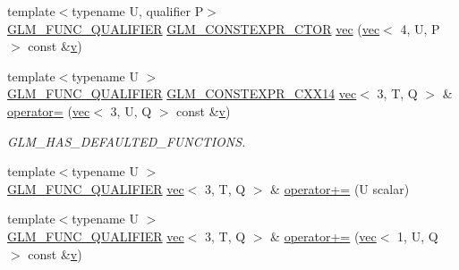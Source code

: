 \begin{DoxyCompactItemize}
\item 
{\footnotesize template$<$typename U, qualifier P$>$ }\\\mbox{\hyperlink{setup_8hpp_a33fdea6f91c5f834105f7415e2a64407}{G\+L\+M\+\_\+\+F\+U\+N\+C\+\_\+\+Q\+U\+A\+L\+I\+F\+I\+ER}} \mbox{\hyperlink{setup_8hpp_ad34178a09666081abdb573c14d1f4a5a}{G\+L\+M\+\_\+\+C\+O\+N\+S\+T\+E\+X\+P\+R\+\_\+\+C\+T\+OR}} \mbox{\hyperlink{structglm_1_1vec_3_013_00_01_t_00_01_q_01_4_a71c4b9fad3b06926109f1f8fa74f6064}{vec}} (\mbox{\hyperlink{structglm_1_1vec}{vec}}$<$ 4, U, P $>$ const \&\mbox{\hyperlink{_s_d_l__opengl_8h_a10a82eabcb59d2fcd74acee063775f90}{v}})
\item 
{\footnotesize template$<$typename U $>$ }\\\mbox{\hyperlink{setup_8hpp_a33fdea6f91c5f834105f7415e2a64407}{G\+L\+M\+\_\+\+F\+U\+N\+C\+\_\+\+Q\+U\+A\+L\+I\+F\+I\+ER}} \mbox{\hyperlink{setup_8hpp_a4dd12abf5e1164bc57f3a34671d03844}{G\+L\+M\+\_\+\+C\+O\+N\+S\+T\+E\+X\+P\+R\+\_\+\+C\+X\+X14}} \mbox{\hyperlink{structglm_1_1vec}{vec}}$<$ 3, T, Q $>$ \& \mbox{\hyperlink{structglm_1_1vec_3_013_00_01_t_00_01_q_01_4_a8d40afef0f44dc9e5c765029f6af40df}{operator=}} (\mbox{\hyperlink{structglm_1_1vec}{vec}}$<$ 3, U, Q $>$ const \&\mbox{\hyperlink{_s_d_l__opengl_8h_a10a82eabcb59d2fcd74acee063775f90}{v}})
\begin{DoxyCompactList}\small\item\em G\+L\+M\+\_\+\+H\+A\+S\+\_\+\+D\+E\+F\+A\+U\+L\+T\+E\+D\+\_\+\+F\+U\+N\+C\+T\+I\+O\+NS. \end{DoxyCompactList}\item 
{\footnotesize template$<$typename U $>$ }\\\mbox{\hyperlink{setup_8hpp_a33fdea6f91c5f834105f7415e2a64407}{G\+L\+M\+\_\+\+F\+U\+N\+C\+\_\+\+Q\+U\+A\+L\+I\+F\+I\+ER}} \mbox{\hyperlink{structglm_1_1vec}{vec}}$<$ 3, T, Q $>$ \& \mbox{\hyperlink{structglm_1_1vec_3_013_00_01_t_00_01_q_01_4_acb693fdeaa576d503444ee370c423cf3}{operator+=}} (U scalar)
\item 
{\footnotesize template$<$typename U $>$ }\\\mbox{\hyperlink{setup_8hpp_a33fdea6f91c5f834105f7415e2a64407}{G\+L\+M\+\_\+\+F\+U\+N\+C\+\_\+\+Q\+U\+A\+L\+I\+F\+I\+ER}} \mbox{\hyperlink{structglm_1_1vec}{vec}}$<$ 3, T, Q $>$ \& \mbox{\hyperlink{structglm_1_1vec_3_013_00_01_t_00_01_q_01_4_aeed08e334ed3515bdb2050d15877bbe8}{operator+=}} (\mbox{\hyperlink{structglm_1_1vec}{vec}}$<$ 1, U, Q $>$ const \&\mbox{\hyperlink{_s_d_l__opengl_8h_a10a82eabcb59d2fcd74acee063775f90}{v}})
\item 

\end{DoxyCompactItemize}

